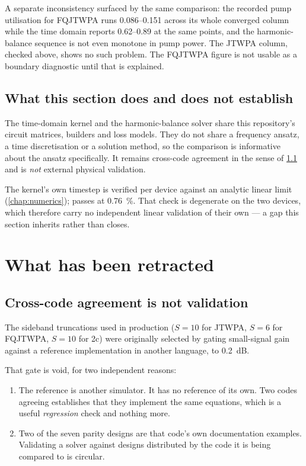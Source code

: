 A separate inconsistency surfaced by the same comparison: the recorded pump
utilisation for FQJTWPA runs \num{0.086}--\num{0.151} across its whole converged
column while the time domain reports \num{0.62}--\num{0.89} at the same points,
and the harmonic-balance sequence is not even monotone in pump power. The JTWPA
column, checked above, shows no such problem. The FQJTWPA figure is not usable
as a boundary diagnostic until that is explained.

\subsection{What this section does and does not establish}

\begin{caveat}
The time-domain kernel and the harmonic-balance solver share this repository's
circuit matrices, builders and loss models. They do not share a frequency
ansatz, a time discretisation or a solution method, so the comparison is
informative about the ansatz specifically. It remains cross-code agreement in
the sense of \cref{sec:jc-retraction} and is \emph{not} external physical
validation.
\end{caveat}

The kernel's own timestep is verified per device against an analytic linear
limit (\cref{chap:numerics});  passes at
\SI{0.76}{\percent}. That check is degenerate on the two  devices,
which therefore carry no independent linear validation of their own --- a gap
this section inherits rather than closes.

\section{What has been retracted}

\subsection{Cross-code agreement is not validation}
\label{sec:jc-retraction}

The sideband truncations used in production ($S=10$ for JTWPA, $S=6$ for
FQJTWPA, $S=10$ for 2c) were originally selected by gating small-signal gain
against a reference implementation in another language, to \SI{0.2}{\dB}.

That gate is void, for two independent reasons:

\begin{enumerate}
\item The reference is another simulator. It has no reference of its own. Two
      codes agreeing establishes that they implement the same equations, which
      is a useful \emph{regression} check and nothing more.
\item Two of the seven parity designs are that code's own documentation
      examples. Validating a solver against designs distributed by the code it
      is being compared to is circular.
\end{enumerate}

